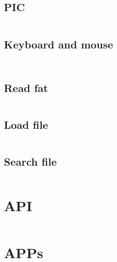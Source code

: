 \documentclass{swfcthesis}
\begin{document}
\subsection{PIC}
\label{sec:pic-1}
\inputminted[tabsize=2, firstline=6, lastline=25,
linenos=true]{c}{../../src/kernel/int.c}


\subsection{Keyboard and mouse}
\label{sec:kbd-mse}
\inputminted[tabsize=2, firstline=21, lastline=45,
linenos=true]{c}{../../src/kernel/keyboard.c}
\inputminted[tabsize=2, firstline=21, lastline=36,
linenos=true]{c}{../../src/kernel/mouse.c}

\subsection{Read fat}
\label{sec:read-fat-1}
\inputminted[tabsize=2, firstline=5, lastline=16,
linenos=true]{c}{../../src/kernel/file.c}


\subsection{Load file}
\label{sec:read-file}
\inputminted[tabsize=2, firstline=18, lastline=40,
linenos=true]{c}{../../src/kernel/file.c}

\subsection{Search file}
\label{sec:search-file-1}
\inputminted[tabsize=2, firstline=42, lastline=93,
linenos=true]{c}{../../src/kernel/file.c}

\section{API}
\label{sec:api-1}
\inputminted[tabsize=2, firstline=10, lastline=14,
linenos=true]{nasm}{../../src/apilib/api001.asm}

\section{APPs}
\label{sec:stars2}
\inputminted[tabsize=2, firstline=1, lastline=29,
linenos=true]{c}{../../src/app/stars2/stars2.c}
\end{document}
